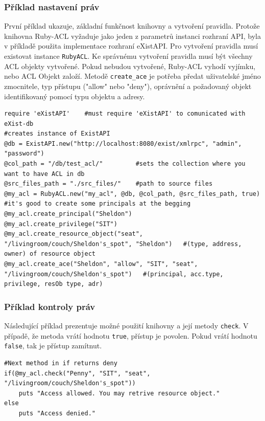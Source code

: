 
\subsubsection{Příklad nastavení práv}
První příklad ukazuje, základní funkčnost knihovny a vytvoření pravidla. 
Protože knihovna Ruby-ACL vyžaduje jako jeden z parametrů instanci rozhraní API, byla v příkladě použita implementace rozhraní eXistAPI. Pro vytvoření pravidla musí existovat instance \verb|RubyACL|. Ke správnému vytvoření pravidla musí být všechny ACL objekty vytvořené. Pokud nebudou vytvořené, Ruby-ACL vyhodí vyjímku, nebo ACL Objekt založí. Metodě \verb|create_ace| je potřeba předat uživatelské jméno zmocnitele, typ přístupu ("allow" nebo "deny"), oprávnění a požadovaný objekt identifikovaný pomocí typu objektu a adresy.
\\
\begin{lstlisting}
require 'eXistAPI'    #must require 'eXistAPI' to comunicated with eXist-db
#creates instance of ExistAPI
@db = ExistAPI.new("http://localhost:8080/exist/xmlrpc", "admin", "password")    
@col_path = "/db/test_acl/"         #sets the collection where you want to have ACL in db
@src_files_path = "./src_files/"    #path to source files
@my_acl = RubyACL.new("my_acl", @db, @col_path, @src_files_path, true)
#it's good to create some principals at the begging
@my_acl.create_principal("Sheldon")
@my_acl.create_privilege("SIT")
@my_acl.create_resource_object("seat", "/livingroom/couch/Sheldon's_spot", "Sheldon")	#(type, address, owner) of resource object
@my_acl.create_ace("Sheldon", "allow", "SIT", "seat", "/livingroom/couch/Sheldon's_spot")	#(principal, acc.type, privilege, resOb type, adr)
\end{lstlisting}


\subsubsection{Příklad kontroly práv}
Následující příklad prezentuje možné použití knihovny a její metody \verb|check|. V případě, že metoda vrátí hodnotu \verb|true|, přístup je povolen. Pokud vrátí hodnotu \verb|false|, tak je přístup zamítnut. 
\\
\begin{lstlisting}[firstnumber=12]
#Next method in if returns deny
if(@my_acl.check("Penny", "SIT", "seat", "/livingroom/couch/Sheldon's_spot"))
	puts "Access allowed. You may retrive resource object."
else
	puts "Access denied."
\end{lstlisting}

